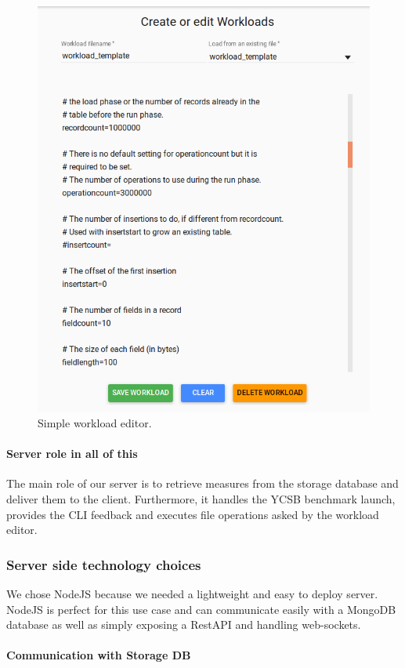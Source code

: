 \documentclass[a4paper,11pt]{report}
\begin{document}
\begin{figure}[ht]
\begin{center}
\includegraphics[width=0.8\linewidth]{images/workload_editor.png}
\caption{Simple workload editor.}
\label{workload_editor}
\end{center}
\end{figure}
\clearpage
\paragraph{Server role in all of this}

The main role of our server is to retrieve measures from the storage database and deliver them to the client. Furthermore, it handles the YCSB benchmark launch, provides the CLI feedback and executes file operations asked by the workload editor. 

\subsubsection{Server side technology choices}

We chose NodeJS because we needed a lightweight and easy to deploy server. NodeJS is perfect for this use case and can communicate easily with a MongoDB database as well as simply exposing a RestAPI and handling web-sockets.

\paragraph{Communication with Storage DB}\label{server:mongo}
\end{document}
